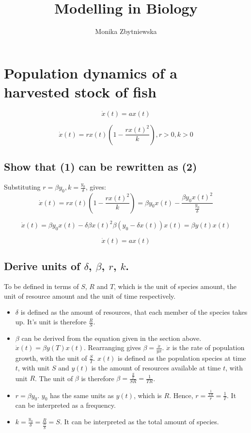 \documentclass[a4paper]{article}
\title{Modelling in Biology}
\author{Monika Zbytniewska}
\begin{document}
\maketitle

\section{Population dynamics of a harvested stock of fish}
\begin{equation}
\dot{x}(t) = ax(t)
\end{equation}

\begin{equation}
\dot{x}(t) = rx(t)(1 - \frac{rx(t)^2}{k}), r>0, k>0
\end{equation}

\subsection{Show that (1) can be rewritten as (2)}


Substituting \(r = \beta y_0,  k = \frac{y_0}{\delta}\), gives: 
\[\dot{x}(t) = rx(t)(1 - \frac{rx(t)^2}{k}) = \beta y_0x(t) - \frac{\beta y_0x(t)^2}{\frac{y_0}{\delta}} \]

\[\dot{x}(t) = \beta y_0x(t) - \delta \beta x(t)^2 \beta (y_0 - \delta x(t)) x(t) = \beta y(t)x(t)\] 

\[\dot{x}(t) = ax(t)\] 

\subsection{Derive units of $\delta$, $\beta$, $r$, $k$.}

To be defined in terms of $S$, $R$ and $T$, which is the unit of species amount, the unit of resource amount and the unit of time respectively. 

\begin{itemize}
  \item $\delta$ is defined as the amount of resources, that each member of the species takes up. It's unit is therefore \(\frac{R}{S}\).
  \item $\beta$ can be derived from the equation given in the section above. \(\dot{x}(t) = \beta y(T)x(t)\). Rearranging gives \(\beta = \frac{\dot{x}}{yx}\). $\dot{x}$ is the rate of population growth, with the unit of $\frac{S}{T}$. $x(t)$ is defined as the population species at time $t$, with unit $S$ and $y(t)$ is the amount of resources available at time $t$, with unit $R$. The unit of $\beta$ is therefore \(\beta = \frac{\frac{S}{T}}{SR} = \frac{1}{TR}\). 
  \item \(r = \beta y_0\). $y_0$ has the same units as $y(t)$, which is $R$. Hence, \(r = \frac{\frac{1}{TR}}{r} = \frac{1}{T}\). It can be interpreted as a frequency. 
  \item \(k = \frac{y_0}{\delta} = \frac{R}{\frac{R}{S}} = S\). It can be interpreted as the total amount of species. 
\end{itemize}
\end{document}
